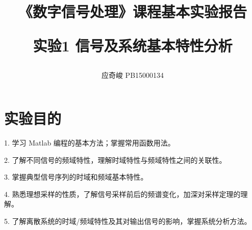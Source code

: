 \documentclass[UTF8]{ctexart}
\title{《数字信号处理》课程基本实验报告\\\begin{Large}实验1  信号及系统基本特性分析\end{Large}}
\author{应奇峻 PB15000134}
\begin{document}
\maketitle
\section{实验目的}
1. 学习 Matlab 编程的基本方法；掌握常用函数用法。

2. 了解不同信号的频域特性，理解时域特性与频域特性之间的关联性。

3. 掌握典型信号序列的时域和频域基本特性。

4. 熟悉理想采样的性质，了解信号采样前后的频谱变化，加深对采样定理的理解。

5. 了解离散系统的时域/频域特性及其对输出信号的影响，掌握系统分析方法。
\section{}
\end{document}
